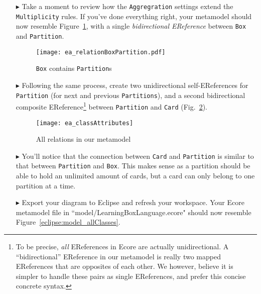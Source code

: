 \begin{itemize}
\item[$\blacktriangleright$] Take a moment to review how the \texttt{Aggregration} settings extend the \texttt{Multiplicity} rules. If you've done everything
right, your metamodel should now resemble Figure~\ref{ea:ereference_completed}, with a single \emph{bidirectional EReference} between \texttt{Box} and
\texttt{Partition}.

\vspace{1cm}

\begin{figure}[htbp]
	\centering
  \texttt{[image: ea\_relationBoxPartition.pdf]}
	\caption{\texttt{Box} contains \texttt{Partition}s}
	\label{ea:ereference_completed}
\end{figure}
\FloatBarrier

\item[$\blacktriangleright$] Following the same process, create two unidirectional self-EReferences for \texttt{Partition} (for next and previous \texttt{Partitions}), and a second bidirectional composite
EReference\footnote{To be precise, \emph{all} EReferences in Ecore are actually unidirectional. A ``bidirectional'' EReference in our metamodel is really two
mapped EReferences that are opposites of each other. We however, believe it is simpler to handle these pairs as single EReferences, and prefer this
concise concrete syntax.} between \texttt{Partition} and \texttt{Card} (Fig.~\ref{ea:ereferences_all}). 

\vspace{1cm}

\begin{figure}[htbp]
	\centering
  \texttt{[image: ea\_classAttributes]}
	\caption{All relations in our metamodel}
	\label{ea:ereferences_all}
\end{figure}
\FloatBarrier

\vspace{1cm}

\item[$\blacktriangleright$] You'll notice that the connection between \texttt{Card} and \texttt{Partition} is similar to that between \texttt{Partition} and
\texttt{Box}. This makes sense as a partition should be able to hold an unlimited amount of cards, but a card can only belong to one partition at a time.

\vspace{1cm}

\item[$\blacktriangleright$] Export your diagram to Eclipse and refresh your workspace. Your Ecore metamodel file in ``model/LearningBoxLanguage.ecore" should now resemble Figure~\ref{eclipse:model_allClasses}.


\end{itemize}
